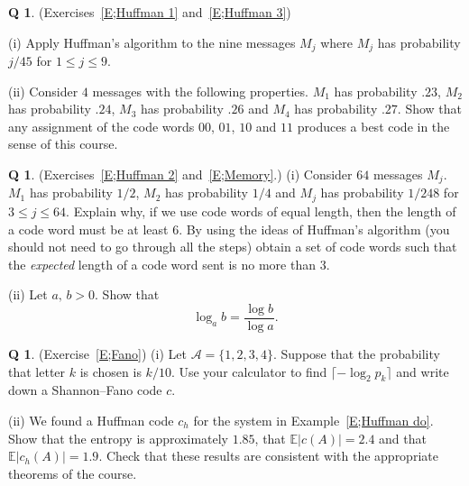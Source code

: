 \documentclass[12pt,a4paper]{article}
\theoremstyle{plain}
\theoremstyle{definition}
\newtheorem{question}[theorem]{Q}
\begin{document}
    \begin{question}
        \label{C1.4}\label{E;Huffman 1 again}
        (Exercises~\ref{E;Huffman 1} and~\ref{E;Huffman 3})

        (i) Apply Huffman's algorithm to the nine messages $M_{j}$ where
        $M_{j}$ has probability $j/45$
        for $1\leq j\leq 9$.

        (ii) Consider
        $4$ messages with the following properties.
        $M_{1}$ has probability $.23$,
        $M_{2}$ has probability $.24$,
        $M_{3}$ has probability $.26$
        and $M_{4}$ has probability $.27$. Show that any
        assignment of the code words $00$, $01$, $10$
        and $11$ produces a best code in the sense of this course.
    \end{question}
    \begin{question}
        \label{C1.5}
        (Exercises~\ref{E;Huffman 2} and~\ref{E;Memory}.)
        (i) Consider $64$ messages $M_{j}$.
        $M_{1}$ has probability $1/2$,
        $M_{2}$ has probability $1/4$ and $M_{j}$ has probability
        $1/248$ for $3\leq j\leq 64$.
        Explain why, if we use code words of equal length,
        then the length of a code word must be at least $6$.
        By using the ideas of Huffman's algorithm (you should not
        need to go through all the steps) obtain a set of
        code words such that the \emph{expected} length of a code word
        sent is no more than $3$.

        (ii) Let $a,\,b>0$. Show that
        \[\log_{a} b=\frac{\log b}{\log a}.\]
    \end{question}
    \begin{question}
        \label{C1.6} (Exercise~\ref{E;Fano})
        (i) Let ${\mathcal A}=\{1,2,3,4\}$. Suppose that the
        probability
        that letter $k$ is chosen is $k/10$.
        Use your calculator
        to find $\lceil -\log_{2} p_{k}\rceil$
        and write down a Shannon--Fano
        code $c$.

        (ii) We found a Huffman code $c_{h}$ for the system
        in Example~\ref{E;Huffman do}.
        Show
        that the entropy is approximately $1.85$,
        that ${\mathbb E}|c(A)|=2.4$
        and that  ${\mathbb E}|c_{h}(A)|=1.9$.
        Check that these results are consistent with
        the appropriate theorems of the course.
    \end{question}
\end{document}
